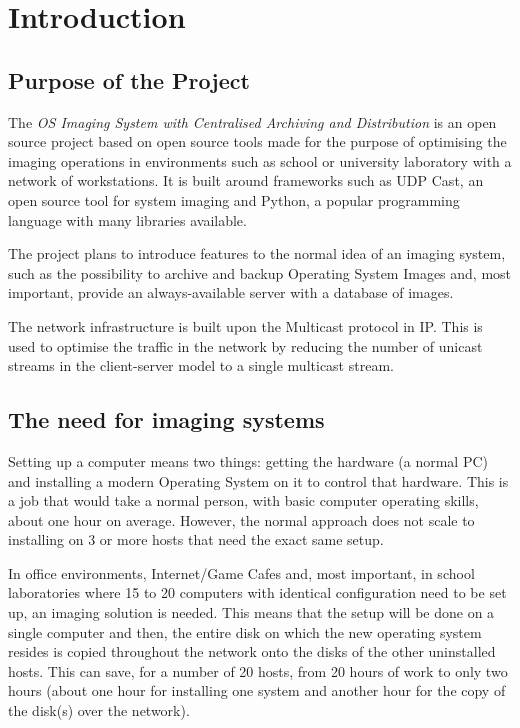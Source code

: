 

\chapter{Introduction}\label{ch:intro}
\bigskip



\section{Purpose of the Project}

The \emph{OS Imaging System with Centralised Archiving and Distribution}
is an open source project based on open source tools made for the purpose
of optimising the imaging operations in environments such as school or
university laboratory with a network of workstations. It is built around
frameworks such as UDP Cast, an open source tool for system imaging and
Python, a popular programming language with many libraries  available.

The project plans to introduce features to the normal idea of an imaging
system, such as the possibility to archive and backup Operating System
Images and, most important, provide an always-available server with a
database of images.

The network infrastructure is built upon the Multicast protocol in IP.
This is used to optimise the traffic in the network by reducing the number
of unicast streams in the client-server model to a single multicast stream.

\section{The need for imaging systems}


Setting up a computer means two things: getting the hardware (a normal
PC) and installing a modern Operating System on it to control that
hardware. This is a job that would take a normal person, with basic
computer operating skills, about one hour on average. However, the
normal approach does not scale to installing on 3 or more hosts that
need the exact same setup.


In office environments, Internet/Game Cafes and, most important, in
school laboratories where 15 to 20 computers with identical
configuration need to be set up, an imaging solution is needed.  This
means that the setup will be done on a single computer and then, the
entire disk on which the new operating system resides is copied
throughout the network onto the disks of the other uninstalled hosts.
This can save, for a number of 20 hosts, from 20 hours of work to only
two hours (about one hour for installing one system and another hour
for the copy of the disk(s) over the network).


